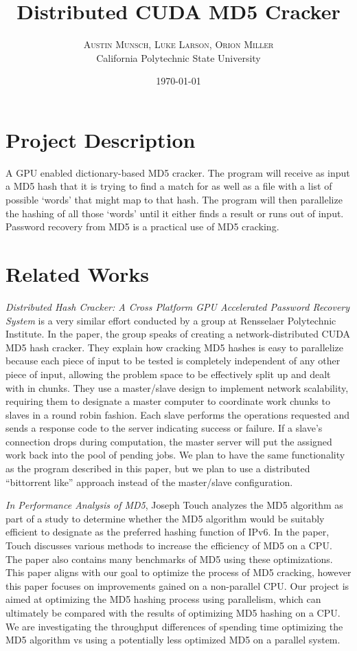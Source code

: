 \documentclass[twoside]{article}
\title{\vspace{-15mm}%
	\fontsize{24pt}{10pt}\selectfont
	\textbf{Distributed CUDA MD5 Cracker}
	}
\author{%
	\large
	\textsc{Austin Munsch, Luke Larson, Orion Miller} \\[2mm]
	\normalsize	California Polytechnic State University \\
	\vspace{-5mm}
	}
\date{\today}
\begin{document}
\maketitle
	

\begin{multicols}{2}

\section{Project Description}
A GPU enabled dictionary-based MD5 cracker. The program will receive as input a MD5 hash that it is trying to find a match for as well as a file with a list of possible `words' that might map to that hash. The program will then parallelize the hashing of all those `words' until it either finds a result or runs out of input. Password recovery from MD5 is a practical use of MD5 cracking.

\section{Related Works}
{\em Distributed Hash Cracker: A Cross Platform GPU Accelerated Password Recovery System} is a very similar effort conducted by a group at Rensselaer Polytechnic Institute. In the paper, the group speaks of creating a network-distributed CUDA MD5 hash cracker. They explain how cracking MD5 hashes is easy to parallelize because each piece of input to be tested is completely independent of any other piece of input, allowing the problem space to be effectively split up and dealt with in chunks. They use a master/slave design to implement network scalability, requiring them to designate a master computer to coordinate work chunks to slaves in a round robin fashion. Each slave performs the operations requested and sends a response code to the server indicating success or failure. If a slave's connection drops during computation, the master server will put the assigned work back into the pool of pending jobs. We plan to have the same functionality as the program described in this paper, but we plan to use a distributed ``bittorrent like'' approach instead of the master/slave configuration.

{\em In Performance Analysis of MD5}, Joseph Touch analyzes the MD5 algorithm as part of a study to determine whether the MD5 algorithm would be suitably efficient to designate as the preferred hashing function of IPv6. In the paper, Touch discusses various methods to increase the efficiency of MD5 on a CPU. The paper also contains many benchmarks of MD5 using these optimizations. This paper aligns with our goal to optimize the process of MD5 cracking, however this paper focuses on improvements gained on a non-parallel CPU. Our project is aimed at optimizing the MD5 hashing process using parallelism, which can ultimately be compared with the results of optimizing MD5 hashing on a CPU. We are investigating the throughput differences of spending time optimizing the MD5 algorithm vs using a potentially less optimized MD5 on a parallel system.


\end{multicols}
\end{document}

